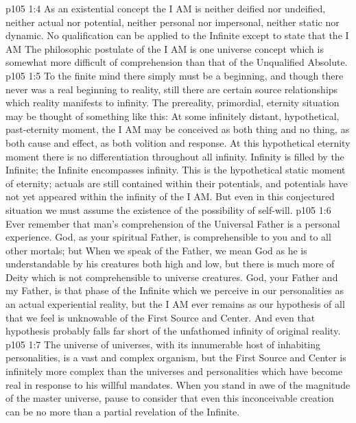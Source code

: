 \vs p105 1:4 As an existential concept the I AM is neither deified nor undeified, neither actual nor potential, neither personal nor impersonal, neither static nor dynamic. No qualification can be applied to the Infinite except to state that the I AM  The philosophic postulate of the I AM is one universe concept which is somewhat more difficult of comprehension than that of the Unqualified Absolute.
\vs p105 1:5 To the finite mind there simply must be a beginning, and though there never was a real beginning to reality, still there are certain source relationships which reality manifests to infinity. The prereality, primordial, eternity situation may be thought of something like this: At some infinitely distant, hypothetical, past\hyp{}eternity moment, the I AM may be conceived as both thing and no thing, as both cause and effect, as both volition and response. At this hypothetical eternity moment there is no differentiation throughout all infinity. Infinity is filled by the Infinite; the Infinite encompasses infinity. This is the hypothetical static moment of eternity; actuals are still contained within their potentials, and potentials have not yet appeared within the infinity of the I AM. But even in this conjectured situation we must assume the existence of the possibility of self\hyp{}will.
\vs p105 1:6 \pc Ever remember that man’s comprehension of the Universal Father is a personal experience. God, as your spiritual Father, is comprehensible to you and to all other mortals; but  When we speak of the Father, we mean God as he is understandable by his creatures both high and low, but there is much more of Deity which is not comprehensible to universe creatures. God, your Father and my Father, is that phase of the Infinite which we perceive in our personalities as an actual experiential reality, but the I AM ever remains as our hypothesis of all that we feel is unknowable of the First Source and Center. And even that hypothesis probably falls far short of the unfathomed infinity of original reality.
\vs p105 1:7 The universe of universes, with its innumerable host of inhabiting personalities, is a vast and complex organism, but the First Source and Center is infinitely more complex than the universes and personalities which have become real in response to his willful mandates. When you stand in awe of the magnitude of the master universe, pause to consider that even this inconceivable creation can be no more than a partial revelation of the Infinite.

